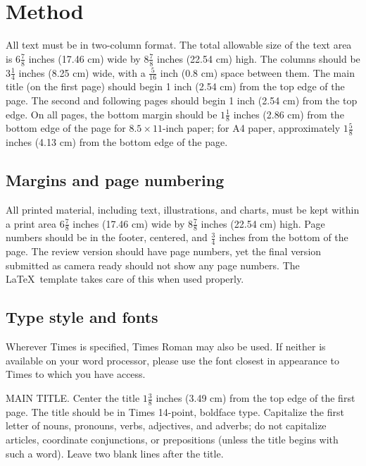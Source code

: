 \section{Method}
\label{sec:formatting}

All text must be in two-column format.
The total allowable size of the text area is $6\frac78$ inches (17.46 cm) wide by $8\frac78$ inches (22.54 cm) high.
The columns should be $3\frac14$ inches (8.25 cm) wide, with a $\frac{5}{16}$ inch (0.8 cm) space between them.
The main title (on the first page) should begin 1 inch (2.54 cm) from the top edge of the page.
The second and following pages should begin 1 inch (2.54 cm) from the top edge.
On all pages, the bottom margin should be $1\frac{1}{8}$ inches (2.86 cm) from the bottom edge of the page for $8.5 \times 11$-inch paper;
for A4 paper, approximately $1\frac{5}{8}$ inches (4.13 cm) from the bottom edge of the
page.

\subsection{Margins and page numbering}

All printed material, including text, illustrations, and charts, must be kept
within a print area $6\frac{7}{8}$ inches (17.46 cm) wide by $8\frac{7}{8}$ inches (22.54 cm)
high.
%
Page numbers should be in the footer, centered, and $\frac{3}{4}$ inches from the bottom of the page.
The review version should have page numbers, yet the final version submitted as camera ready should not show any page numbers.
The \LaTeX\ template takes care of this when used properly.



\subsection{Type style and fonts}

Wherever Times is specified, Times Roman may also be used.
If neither is available on your word processor, please use the font closest in
appearance to Times to which you have access.

MAIN TITLE.
Center the title $1\frac{3}{8}$ inches (3.49 cm) from the top edge of the first page.
The title should be in Times 14-point, boldface type.
Capitalize the first letter of nouns, pronouns, verbs, adjectives, and adverbs;
do not capitalize articles, coordinate conjunctions, or prepositions (unless the title begins with such a word).
Leave two blank lines after the title.


